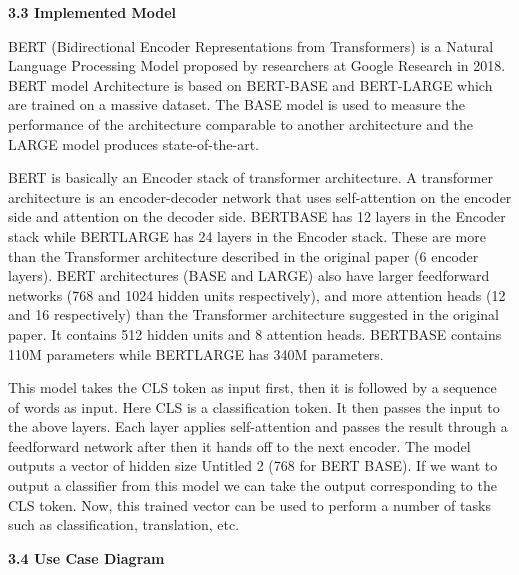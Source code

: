 \documentclass[a4paper,12pt]{article}
\begin{document}
{{{\begin{enumerate}
		\end{enumerate}
								

    					
	
		\begin{flushleft}
			\fontsize{13}{15}\selectfont\textbf{3.3 Implemented Model}
			\label{bert}
		\end{flushleft}

   BERT (Bidirectional Encoder Representations from Transformers) is a Natural 
Language Processing Model proposed by researchers at Google Research in 2018. 
BERT model Architecture is based on  BERT-BASE and BERT-LARGE which are 
trained on a massive dataset. The BASE model is used to measure the performance of 
the architecture comparable to another architecture and the LARGE model produces 
state-of-the-art.

BERT is basically an Encoder stack of transformer architecture. A transformer 
architecture is an encoder-decoder network that uses self-attention on the encoder side 
and attention on the decoder side. BERTBASE has 12 layers in the Encoder stack while 
BERTLARGE has 24 layers in the Encoder stack. These are more than the Transformer 
architecture described in the original paper (6 encoder layers). 
BERT architectures 
(BASE and LARGE) also have larger feedforward networks (768 and 1024 hidden units 
respectively), and more attention heads (12 and 16 respectively) than the Transformer 
architecture suggested in the original paper. It contains 512 hidden units and 8 attention 
heads. BERTBASE contains 110M parameters while BERTLARGE has 340M 
parameters.

 This model takes the CLS token as input first, then it is followed by a sequence of words 
as input. Here CLS is a classification token. It then passes the input to the above layers. 
Each layer applies 
self-attention and passes the result through a feedforward network 
after then it hands off to the next encoder. The model outputs a vector of hidden size 
Untitled
 2
(768 for BERT BASE). If we want to output a classifier from this model we can take the 
output corresponding to the CLS token. Now, this trained vector can be used to perform a number of tasks such as 
classification, translation, etc.


  
		\newpage
		\begin{flushleft}
			\fontsize{13}{15}\selectfont\textbf{3.4 Use Case Diagram}
			\phantomsection
			\label{usecase}
		\end{flushleft}
								
}}}
\end{document}
